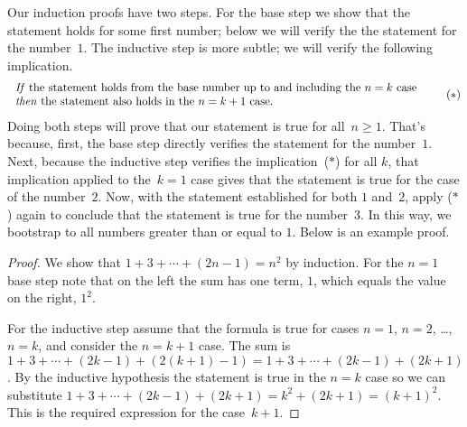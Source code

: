 \documentclass{ibl}
\begin{document}
Our induction proofs have two steps.
For the base step we show that the statement holds for some first number;
below we will verify the the statement for the number~$1$.
The inductive step is more subtle;
we will verify the following implication.
\begin{equation*}
  \begin{tabular}{l} 
  \textit{If} the statement holds from the base number up to and including 
   the $n=k$ case \\
  \textit{then} the statement also holds in the~$n=k+1$ case.
  \end{tabular}
  \tag{$*$}
\end{equation*}
Doing both steps will 
prove that our statement is true for all~$n\geq 1$.
That's because, first, the base step
directly verifies the statement for the number~$1$.
Next, because the inductive step verifies the implication~($*$) for all $k$, 
that implication applied to the~$k=1$ case gives 
that the statement is true for the case of the number~$2$. 
Now, with the statement established for both $1$ and~$2$, 
apply ($*$) again to conclude that the statement is true for the number~$3$.
In this way, we bootstrap to all numbers greater than or equal to $1$.
Below is an example proof.

\begin{proof}
  We show that $1+3+\cdots+(2n-1)=n^2$ by induction.
  For the $n=1$ base step note that on the left the sum has one term, $1$,
  which equals the value on the right, $1^2$.

  For the inductive step assume that the 
  formula is true for cases $n=1$, $n=2$, \ldots, $n=k$, and 
  consider the $n=k+1$ case.
  The sum is $1+3+\cdots+(2k-1)+(2(k+1)-1)=1+3+\cdots+(2k-1)+(2k+1)$.
  By the inductive hypothesis the statement is true in the $n=k$ case
  so we can substitute 
  $1+3+\cdots+(2k-1)+(2k+1)=k^2+(2k+1)=(k+1)^2$.
  This is the required expression for the case~$k+1$.
\end{proof}
\end{document}

